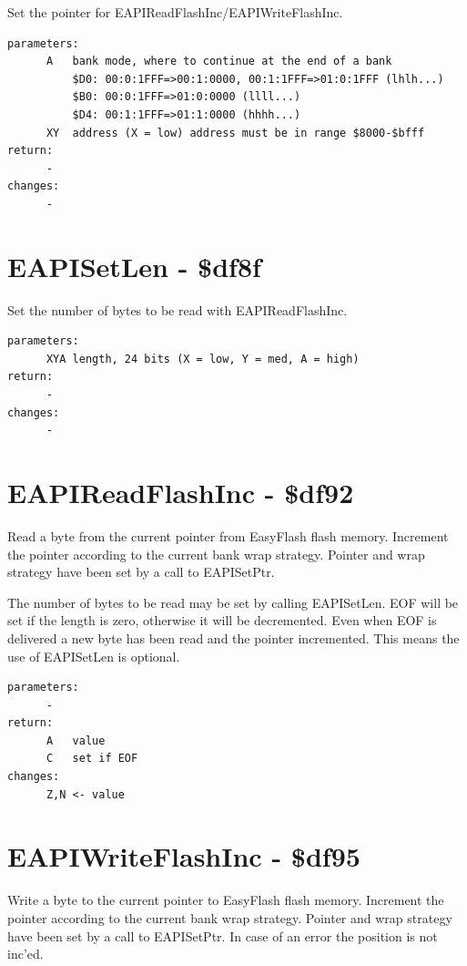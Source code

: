 \documentclass[a4paper,oneside]{memoir}
\begin{document}
Set the pointer for EAPIReadFlashInc/EAPIWriteFlashInc.

\begin{verbatim}
parameters:
      A   bank mode, where to continue at the end of a bank
          $D0: 00:0:1FFF=>00:1:0000, 00:1:1FFF=>01:0:1FFF (lhlh...)
          $B0: 00:0:1FFF=>01:0:0000 (llll...)
          $D4: 00:1:1FFF=>01:1:0000 (hhhh...)
      XY  address (X = low) address must be in range $8000-$bfff
return:
      -
changes:
      -
\end{verbatim}


\section{EAPISetLen - \$df8f}

Set the number of bytes to be read with EAPIReadFlashInc.

\begin{verbatim}
parameters:
      XYA length, 24 bits (X = low, Y = med, A = high)
return:
      -
changes:
      -
\end{verbatim}


\section{EAPIReadFlashInc - \$df92}

Read a byte from the current pointer from EasyFlash flash memory.
Increment the pointer according to the current bank wrap strategy.
Pointer and wrap strategy have been set by a call to EAPISetPtr.

The number of bytes to be read may be set by calling EAPISetLen.
EOF will be set if the length is zero, otherwise it will be decremented.
Even when EOF is delivered a new byte has been read and the pointer
incremented. This means the use of EAPISetLen is optional.

\begin{verbatim}
parameters:
      -
return:
      A   value
      C   set if EOF
changes:
      Z,N <- value
\end{verbatim}


\section{EAPIWriteFlashInc - \$df95}

Write a byte to the current pointer to EasyFlash flash memory.
Increment the pointer according to the current bank wrap strategy.
Pointer and wrap strategy have been set by a call to EAPISetPtr.
In case of an error the position is not inc'ed.
\end{document}
